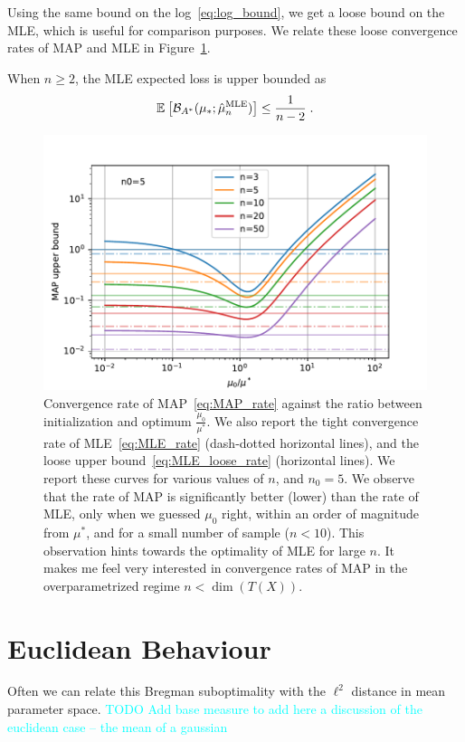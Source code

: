 \documentclass{article}
\newcommand{\TODO}[1]{\textcolor{cyan}{TODO #1}}
\newcommand*{\expect}[2][]{\ensuremath{\mathbb{E}_{#1} \left[ #2 \right] }} %
\newcommand{\logpart}{A}
\newcommand{\bregmanconj}{\cB_{\logpart^*}}
\begin{document}
Using the same bound on the log~\eqref{eq:log_bound}, we  get a loose bound on the MLE, which is useful for comparison purposes.
We relate these loose convergence rates of MAP and MLE in Figure~\ref{fig:MAP_rate}.
\begin{example}
\begin{corollary} When $n\geq 2$, the MLE expected loss is upper bounded as
\begin{equation}
	\expect{\bregmanconj( \mu_*; \hat \mu_n^\text{MLE}) }
	\leq \inv{n-2} \; .
	\label{eq:MLE_loose_rate}
\end{equation}
\end{corollary}
\end{example}


\begin{figure}[ht]
	\centering
	\includegraphics[width=.7\textwidth]{figs/MAP_rates/MAP_rate_n0=5.pdf}
	\caption{
	Convergence rate of MAP~\eqref{eq:MAP_rate} 
	\label{fig:MAP_rate} against the ratio between initialization and optimum $ \frac{\mu_0}{\mu^*}$. 
	We also report the tight convergence rate of MLE~\eqref{eq:MLE_rate} (dash-dotted horizontal lines), and the loose upper bound~\eqref{eq:MLE_loose_rate} (horizontal lines). 
	We report these curves for various values of $n$, and $n_0=5$. 
	We observe that the rate of MAP is significantly better (lower) than the rate of MLE, only when we guessed $\mu_0$ right, within an order of magnitude from $\mu^*$, and for a small number of sample ($n<10$). 
	This observation hints towards the optimality of MLE for large $n$. 
	It makes me feel very interested in convergence rates of MAP in the overparametrized regime $n<\dim(T(X))$.
	}
\end{figure}

\section{Euclidean Behaviour}
Often we can relate this Bregman suboptimality with the $\ell^2$ distance in mean parameter space. 
\TODO{Add base measure to add here a discussion of the euclidean case -- the mean of a gaussian}
\end{document}
